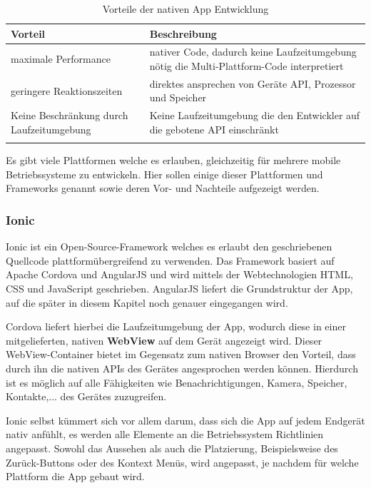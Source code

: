 \begin{table} [H]
	\begin{center}
		\begin{tabular}{p{4cm} p{10cm}}
			\rowcolor{black!20}  \textbf{Vorteil} & \textbf{Beschreibung} \\
			\hline \toprule
			maximale Performance & nativer Code, dadurch keine Laufzeitumgebung nötig die Multi-Plattform-Code interpretiert \\ \hline \addlinespace
			geringere Reaktionszeiten & direktes ansprechen von Geräte API, Prozessor und Speicher \\ \hline \addlinespace
			Keine Beschränkung durch Laufzeitumgebung & Keine Laufzeitumgebung die den Entwickler auf die gebotene API einschränkt \\ \hline \addlinespace
		\end{tabular}
	\end{center}
	\label{VorteileNativ}
	\caption[Vorteile der nativen App Entwicklung]{Vorteile der nativen App Entwicklung}
\end{table}

Es gibt viele Plattformen welche es erlauben, gleichzeitig für mehrere mobile Betriebssysteme zu entwickeln. Hier sollen einige dieser Plattformen und Frameworks genannt sowie deren Vor- und Nachteile aufgezeigt werden.

\subsubsection{Ionic}
Ionic \cite{IONIC16} ist ein Open-Source-Framework welches es erlaubt den geschriebenen Quellcode plattformübergreifend zu verwenden. Das Framework basiert auf Apache Cordova und AngularJS \cite{ANGULAR16} und wird mittels der Webtechnologien HTML, CSS und JavaScript geschrieben. AngularJS liefert die Grundstruktur der App, auf die später in diesem Kapitel noch genauer eingegangen wird.

Cordova liefert hierbei die Laufzeitumgebung der App, wodurch diese in einer mitgelieferten, nativen \textbf{WebView} auf dem Gerät angezeigt wird. Dieser WebView-Container bietet im Gegensatz zum nativen Browser den Vorteil, dass durch ihn die nativen APIs des Gerätes angesprochen werden können. Hierdurch ist es möglich auf alle Fähigkeiten wie Benachrichtigungen, Kamera, Speicher, Kontakte,... des Gerätes zuzugreifen.

Ionic selbst kümmert sich vor allem darum, dass sich die App auf jedem Endgerät nativ anfühlt, es werden alle Elemente an die Betriebssystem Richtlinien angepasst. Sowohl das Aussehen als auch die Platzierung, Beispielsweise des Zurück-Buttons oder des Kontext Menüs, wird angepasst, je nachdem für welche Plattform die App gebaut wird. 

